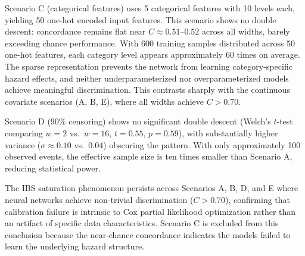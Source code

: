 \documentclass[12pt,a4paper]{article}
\begin{document}
Scenario C (categorical features) uses 5 categorical features with 10 levels each, yielding 50 one-hot encoded input features. This scenario shows no double descent: concordance remains flat near $C \approx 0.51$--$0.52$ across all widths, barely exceeding chance performance. With 600 training samples distributed across 50 one-hot features, each category level appears approximately 60 times on average. The sparse representation prevents the network from learning category-specific hazard effects, and neither underparameterized nor overparameterized models achieve meaningful discrimination. This contrasts sharply with the continuous covariate scenarios (A, B, E), where all widths achieve $C > 0.70$.

Scenario D (90\% censoring) shows no significant double descent (Welch's $t$-test comparing $w=2$ vs.\ $w=16$, $t = 0.55$, $p = 0.59$), with substantially higher variance ($\sigma \approx 0.10$ vs.\ $0.04$) obscuring the pattern. With only approximately 100 observed events, the effective sample size is ten times smaller than Scenario A, reducing statistical power.

The IBS saturation phenomenon persists across Scenarios A, B, D, and E where neural networks achieve non-trivial discrimination ($C > 0.70$), confirming that calibration failure is intrinsic to Cox partial likelihood optimization rather than an artifact of specific data characteristics. Scenario C is excluded from this conclusion because the near-chance concordance indicates the models failed to learn the underlying hazard structure.

\subsection{\texorpdfstring{}{Extended Scenarios}}


\end{document}
